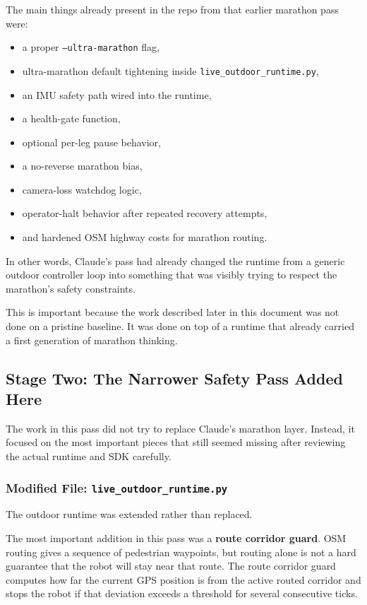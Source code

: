 \documentclass[11pt]{article}
\begin{document}
The main things already present in the repo from that earlier marathon pass were:
\begin{itemize}[leftmargin=*]
\item a proper \texttt{--ultra-marathon} flag,
\item ultra-marathon default tightening inside \texttt{live\_outdoor\_runtime.py},
\item an IMU safety path wired into the runtime,
\item a health-gate function,
\item optional per-leg pause behavior,
\item a no-reverse marathon bias,
\item camera-loss watchdog logic,
\item operator-halt behavior after repeated recovery attempts,
\item and hardened OSM highway costs for marathon routing.
\end{itemize}

In other words, Claude's pass had already changed the runtime from a generic outdoor controller loop into something that was visibly trying to respect the marathon's safety constraints.

This is important because the work described later in this document was not done on a pristine baseline. It was done on top of a runtime that already carried a first generation of marathon thinking.

\subsection{Stage Two: The Narrower Safety Pass Added Here}
The work in this pass did not try to replace Claude's marathon layer. Instead, it focused on the most important pieces that still seemed missing after reviewing the actual runtime and SDK carefully.

\subsubsection{Modified File: \texttt{live\_outdoor\_runtime.py}}
The outdoor runtime was extended rather than replaced.

The most important addition in this pass was a \textbf{route corridor guard}. OSM routing gives a sequence of pedestrian waypoints, but routing alone is not a hard guarantee that the robot will stay near that route. The route corridor guard computes how far the current GPS position is from the active routed corridor and stops the robot if that deviation exceeds a threshold for several consecutive ticks.
\end{document}
